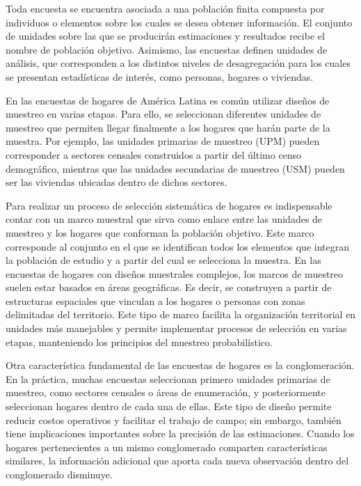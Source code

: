 \documentclass[
  spanish,
  12pt,
]{book}
\begin{document}
Toda encuesta se encuentra asociada a una población finita compuesta por individuos o elementos sobre los cuales se desea obtener información. El conjunto de unidades sobre las que se producirán estimaciones y resultados recibe el nombre de población objetivo. Asimismo, las encuestas definen unidades de análisis, que corresponden a los distintos niveles de desagregación para los cuales se presentan estadísticas de interés, como personas, hogares o viviendas.

En las encuestas de hogares de América Latina es común utilizar diseños de muestreo en varias etapas. Para ello, se seleccionan diferentes unidades de muestreo que permiten llegar finalmente a los hogares que harán parte de la muestra. Por ejemplo, las unidades primarias de muestreo (UPM) pueden corresponder a sectores censales construidos a partir del último censo demográfico, mientras que las unidades secundarias de muestreo (USM) pueden ser las viviendas ubicadas dentro de dichos sectores.

Para realizar un proceso de selección sistemática de hogares es indispensable contar con un marco muestral que sirva como enlace entre las unidades de muestreo y los hogares que conforman la población objetivo. Este marco corresponde al conjunto en el que se identifican todos los elementos que integran la población de estudio y a partir del cual se selecciona la muestra. En las encuestas de hogares con diseños muestrales complejos, los marcos de muestreo suelen estar basados en áreas geográficas. Es decir, se construyen a partir de estructuras espaciales que vinculan a los hogares o personas con zonas delimitadas del territorio. Este tipo de marco facilita la organización territorial en unidades más manejables y permite implementar procesos de selección en varias etapas, manteniendo los principios del muestreo probabilístico.

Otra característica fundamental de las encuestas de hogares es la conglomeración. En la práctica, muchas encuestas seleccionan primero unidades primarias de muestreo, como sectores censales o áreas de enumeración, y posteriormente seleccionan hogares dentro de cada una de ellas. Este tipo de diseño permite reducir costos operativos y facilitar el trabajo de campo; sin embargo, también tiene implicaciones importantes sobre la precisión de las estimaciones. Cuando los hogares pertenecientes a un mismo conglomerado comparten características similares, la información adicional que aporta cada nueva observación dentro del conglomerado disminuye.
\end{document}
